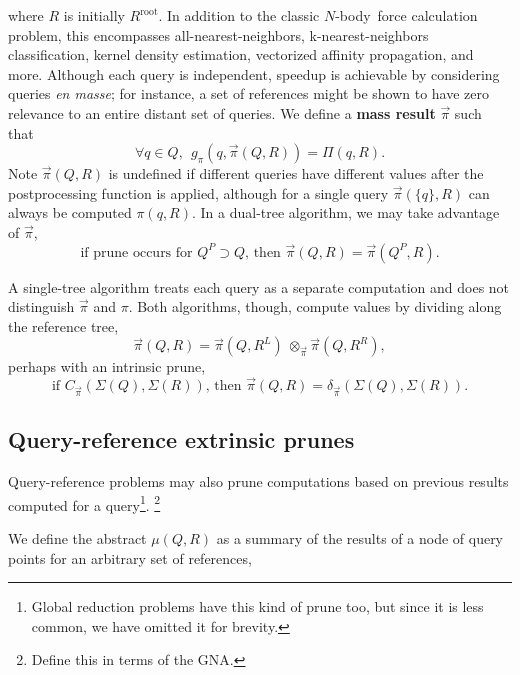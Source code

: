 \documentclass[times, leqno,twocolumn]{article}
\newcommand{\defterm}[1]{{\bf #1}}
\newcommand{\nbody}{$N$-body}
\newcommand{\kdroot}[1]{#1^{\text{root}}}
\newcommand{\kdleft}[1]{#1^{\!L}}
\newcommand{\kdright}[1]{#1^{\!R}}
\newcommand{\kdparent}[1]{#1^{\!P}}
\newcommand{\myop}[1]{{\scriptstyle\:}\otimes_{\!#1}}
\newcommand{\letterqr}{\pi}
\newcommand{\outqr}{\Pi}
\newcommand{\inqr}{\pi}
\newcommand{\gqr}{g_{\letterqr}}
\newcommand{\letterqrv}{\vec{\pi}}
\newcommand{\inqrv}{\vec{\pi}}
\newcommand{\opqrv}{\myop{\letterqrv}}
\newcommand{\deltaqrv}{\delta_{\letterqrv}}
\newcommand{\canpruneqrv}{C_{\letterqrv}}
\newcommand{\inmu}{\mu}
\newcommand{\outstat}{\Sigma}
\begin{document}
\noindent where $R$ is initially $\kdroot{R}$.
In addition to the classic \nbody\ force calculation problem, this encompasses all-nearest-neighbors, k-nearest-neighbors classification, kernel density estimation, vectorized affinity propagation, and more.
Although each query is independent, speedup is achievable by considering queries {\it en masse}; for instance, a set of references might be shown to have zero relevance to an entire distant set of queries.
We define a \defterm{mass result} $\inqrv$ such that
\begin{equation}
\forall q \in Q,~~ \gqr(q, \inqrv(Q, R)) = \outqr(q, R).
\end{equation}
\noindent Note $\inqrv(Q,R)$ is undefined if different queries have different values after the postprocessing function is applied, although for a single query $\inqrv(\{q\}, R)$ can always be computed $\inqr(q, R)$.
In a dual-tree algorithm, we may take advantage of $\inqrv$,
\begin{equation}
\text{if prune occurs for } \kdparent{Q} \supset Q \text{, then } \inqrv(Q, R) = \inqrv(\kdparent{Q}, R).
\label{eqn:parentqrv}
\end{equation}

\noindent
A single-tree algorithm treats each query as a separate computation and does not distinguish $\inqrv$ and $\inqr$.
Both algorithms, though, compute values by dividing along the reference tree,
\begin{equation}
\inqrv(Q, R) = \inqrv(Q, \kdleft{R}) \opqrv \inqrv(Q, \kdright{R}),
\label{eqn:dividepi}
\end{equation}
\noindent perhaps with an intrinsic prune,
\begin{equation}
\text{if } \canpruneqrv(\outstat(Q), \outstat(R)) \text{, then } \inqrv(Q, R) = \deltaqrv(\outstat(Q), \outstat(R)).
\label{eqn:prunepi}
\end{equation}

\subsection{Query-reference extrinsic prunes}

Query-reference problems may also prune computations based on previous results computed for a query\footnote{Global reduction problems have this kind of prune too, but since it is less common, we have omitted it for brevity.}.
\footnote{Define this in terms of the GNA.}

We define the abstract $\inmu(Q, R)$ as a summary of the results of a node of query points for an arbitrary set of references,
\end{document}
